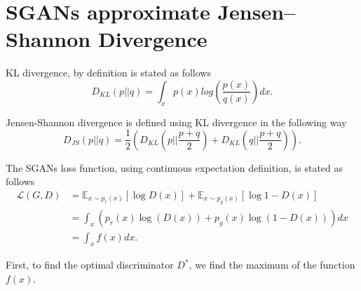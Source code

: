 \chapter{SGANs approximate Jensen–Shannon Divergence}
\label{apx:JSD}
KL divergence, by definition is stated as follows
\begin{equation*}
  D_{KL}(p || q) = \int_xp(x)log(\frac{p(x)}{q(x)})dx. 
\end{equation*}

Jensen-Shannon divergence is defined using KL divergence in the following
way
\begin{equation*}
D_{JS}(p || q) = \frac{1}{2}(D_{KL}(p || \frac{p+q}{2}) + D_{KL}(q || \frac{p+q}{2})).
\end{equation*}


The SGANs loss function, using continuous expectation definition, is stated as follows
\begin{equation*}
  \begin{split}
    \mathcal{L}(G, D) & =  \mathbb{E}_{x \sim p_r(x)}[\log{D(x)}] +  \mathbb{E}_{x \sim p_g(x)}[\log{1 - D(x)}] \\
    & = \int_x(p_r(x)\log{(D(x))} + p_g(x)\log{(1-D(x))})dx \\
    & = \int_xf(x)dx.
  \end{split}
\end{equation*}

First, to find the optimal discriminator $D^*$, we find the maximum of the
function $f(x)$.

